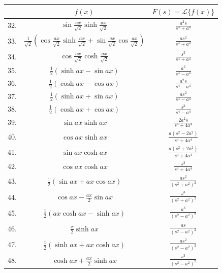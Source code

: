 \documentclass[10pt]{article}
\begin{document}
\begin{center}
\begin{tabular}{|c|c|c|}
\hline
 & $f(x)$ & $F(s)=\mathscr{L}\{f(x)\}$ \\
\hline
32. & $\sin \frac{a x}{\sqrt{2}} \sinh \frac{a x}{\sqrt{2}}$ & $\frac{a^{2} s}{s^{4}+a^{4}}$ \\
\hline
33. & $\frac{1}{\sqrt{2}}\left(\cos \frac{a x}{\sqrt{2}} \sinh \frac{a x}{\sqrt{2}}+\sin \frac{a x}{\sqrt{2}} \cos \frac{a x}{\sqrt{2}}\right)$ & $\frac{a s^{2}}{s^{4}+a^{4}}$ \\
\hline
34. & $\cos \frac{a x}{\sqrt{2}} \cosh \frac{a x}{\sqrt{2}}$ & $\frac{s^{3}}{s^{4}+a^{4}}$ \\
\hline
35. & $\frac{1}{2}(\sinh a x-\sin a x)$ & $\frac{a^{3}}{s^{4}-a^{4}}$ \\
\hline
36. & $\frac{1}{2}(\cosh a x-\cos a x)$ & $\frac{a^{2} s}{s^{4}-a^{4}}$ \\
\hline
37. & $\frac{1}{2}(\sinh a x+\sin a x)$ & $\frac{a s^{2}}{s^{4}-a^{4}}$ \\
\hline
38. & $\frac{1}{2}(\cosh a x+\cos a x)$ & $\frac{s^{3}}{s^{4}-a^{4}}$ \\
\hline
39. & $\sin a x \sinh a x$ & $\frac{2 a^{2} s}{s^{4}+4 a^{4}}$ \\
\hline
40. & $\cos a x \sinh a x$ & $\frac{a\left(s^{2}-2 a^{2}\right)}{s^{4}+4 a^{4}}$ \\
\hline
41. & $\sin a x \cosh a x$ & $\frac{a\left(s^{2}+2 a^{2}\right)}{s^{4}+4 a^{4}}$ \\
\hline
42. & $\cos a x \cosh a x$ & $\frac{s^{3}}{s^{4}+4 a^{4}}$ \\
\hline
43. & $\frac{1}{2}(\sin a x+a x \cos a x)$ & $\frac{a s^{2}}{\left(s^{2}+a^{2}\right)^{2}}$ \\
\hline
44. & $\cos a x-\frac{a x}{2} \sin a x$ & $\frac{s^{3}}{\left(s^{2}+a^{2}\right)^{2}}$ \\
\hline
45. & $\frac{1}{2}(a x \cosh a x-\sinh a x)$ & $\frac{a^{3}}{\left(s^{2}-a^{2}\right)^{2}}$ \\
\hline
46. & $\frac{x}{2} \sinh a x$ & $\frac{a s}{\left(s^{2}-a^{2}\right)^{2}}$ \\
\hline
47. & $\frac{1}{2}(\sinh a x+a x \cosh a x)$ & $\frac{a s^{2}}{\left(s^{2}-a^{2}\right)^{2}}$ \\
\hline
48. & $\cosh a x+\frac{a x}{2} \sinh a x$ & $\frac{s^{3}}{\left(s^{2}-a^{2}\right)^{2}}$ \\
\hline
\end{tabular}
\end{center}
\end{document}
